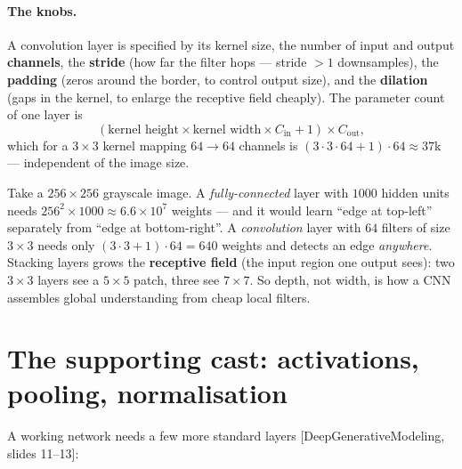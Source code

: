 \documentclass[11pt]{article}
\newcommand{\deck}[1]{\textsf{\small[#1]}}
\begin{document}
\paragraph{The knobs.} A convolution layer is specified by its kernel size, the
number of input and output \textbf{channels}, the \textbf{stride} (how far the
filter hops --- stride $>1$ downsamples), the \textbf{padding} (zeros around the
border, to control output size), and the \textbf{dilation} (gaps in the kernel,
to enlarge the receptive field cheaply). The parameter count of one layer is
\[
(\text{kernel height}\times\text{kernel width}\times C_{\text{in}} + 1)\times C_{\text{out}},
\]
which for a $3\times3$ kernel mapping $64\to64$ channels is
$(3\cdot3\cdot64+1)\cdot64 \approx 37$k --- independent of the image size.

\begin{notebox}
Take a $256\times256$ grayscale image. A \emph{fully-connected} layer with $1000$
hidden units needs $256^2\times1000\approx 6.6\times10^7$ weights --- and it would
learn ``edge at top-left'' separately from ``edge at bottom-right''. A
\emph{convolution} layer with $64$ filters of size $3\times3$ needs only
$(3\cdot3+1)\cdot64=640$ weights and detects an edge \emph{anywhere}. Stacking
layers grows the \textbf{receptive field} (the input region one output sees):
two $3\times3$ layers see a $5\times5$ patch, three see $7\times7$. So depth, not
width, is how a CNN assembles global understanding from cheap local filters.
\end{notebox}

\section{The supporting cast: activations, pooling, normalisation}

A working network needs a few more standard layers \deck{DeepGenerativeModeling,
slides 11--13}:
\end{document}
